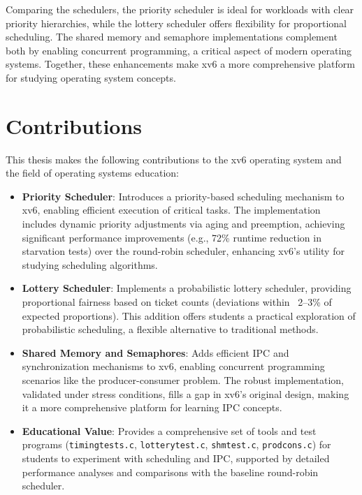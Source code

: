 \documentclass[12pt]{article}
\begin{document}
Comparing the schedulers, the priority scheduler is ideal for workloads with clear priority hierarchies, while the lottery scheduler offers flexibility for proportional scheduling. The shared memory and semaphore implementations complement both by enabling concurrent programming, a critical aspect of modern operating systems. Together, these enhancements make xv6 a more comprehensive platform for studying operating system concepts.

\section{Contributions}
\label{sec:contributions}

This thesis makes the following contributions to the xv6 operating system and the field of operating systems education:

\begin{itemize}
    \item \textbf{Priority Scheduler}: Introduces a priority-based scheduling mechanism to xv6, enabling efficient execution of critical tasks. The implementation includes dynamic priority adjustments via aging and preemption, achieving significant performance improvements (e.g., 72\% runtime reduction in starvation tests) over the round-robin scheduler, enhancing xv6’s utility for studying scheduling algorithms.
    \item \textbf{Lottery Scheduler}: Implements a probabilistic lottery scheduler, providing proportional fairness based on ticket counts (deviations within ~2–3\% of expected proportions). This addition offers students a practical exploration of probabilistic scheduling, a flexible alternative to traditional methods.
    \item \textbf{Shared Memory and Semaphores}: Adds efficient IPC and synchronization mechanisms to xv6, enabling concurrent programming scenarios like the producer-consumer problem. The robust implementation, validated under stress conditions, fills a gap in xv6’s original design, making it a more comprehensive platform for learning IPC concepts.
    \item \textbf{Educational Value}: Provides a comprehensive set of tools and test programs (\texttt{timingtests.c}, \texttt{lotterytest.c}, \texttt{shmtest.c}, \texttt{prodcons.c}) for students to experiment with scheduling and IPC, supported by detailed performance analyses and comparisons with the baseline round-robin scheduler.
\end{itemize}
\end{document}
